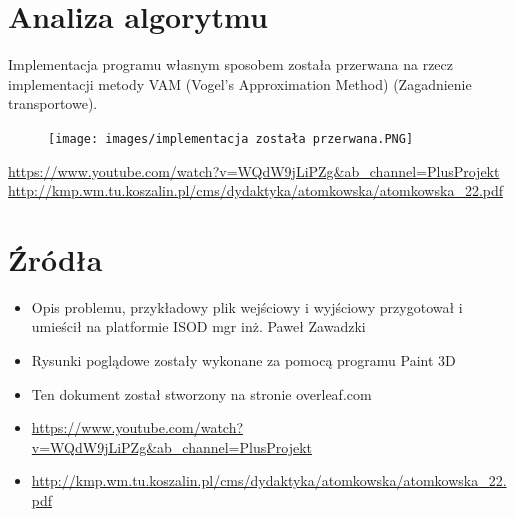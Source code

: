 \documentclass{article}
\begin{document}
\section{Analiza algorytmu}
Implementacja programu własnym sposobem została przerwana na rzecz implementacji metody VAM (Vogel’s Approximation Method) (Zagadnienie transportowe).

\begin{figure} [hbt!]
    \texttt{[image: images/implementacja została przerwana.PNG]}
\end{figure}

\url{https://www.youtube.com/watch?v=WQdW9jLiPZg&ab_channel=PlusProjekt}
\url{http://kmp.wm.tu.koszalin.pl/cms/dydaktyka/atomkowska/atomkowska_22.pdf}

\clearpage

\section{Źródła}

\begin{itemize}
    \item Opis problemu, przykładowy plik wejściowy i wyjściowy przygotował i umieścił na platformie ISOD mgr inż. Paweł Zawadzki
    \item Rysunki poglądowe zostały wykonane za pomocą programu Paint 3D
    \item Ten dokument został stworzony na stronie overleaf.com
    \item \url{https://www.youtube.com/watch?v=WQdW9jLiPZg&ab_channel=PlusProjekt}
    \item \url{http://kmp.wm.tu.koszalin.pl/cms/dydaktyka/atomkowska/atomkowska_22.pdf}
\end{itemize}
\end{document}
